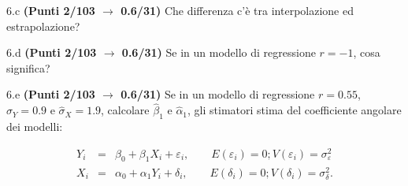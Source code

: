 \documentclass[
  11pt,
]{book}
\theoremstyle{mytheoremstyle}
\theoremstyle{mydefstyle}
\begin{document}
6.c \textbf{(Punti 2/103 \(\rightarrow\) 0.6/31)} Che differenza c'è tra interpolazione ed estrapolazione?

6.d \textbf{(Punti 2/103 \(\rightarrow\) 0.6/31)} Se in un modello di regressione \(r=-1\), cosa significa?

6.e \textbf{(Punti 2/103 \(\rightarrow\) 0.6/31)} Se in un modello di regressione \(r=0.55\), \(\hat\sigma_Y=0.9\) e \(\hat\sigma_X=1.9\), calcolare \(\hat\beta_1\) e
\(\hat\alpha_1\), gli stimatori stima del coefficiente angolare dei modelli:

\begin{eqnarray*}
Y_i &=& \beta_0+\beta_1 X_i + \varepsilon_i, \qquad E(\varepsilon_i)=0; V(\varepsilon_i)=\sigma_\varepsilon^2\\
X_i &=& \alpha_0+\alpha_1 Y_i + \delta_i, \qquad E(\delta_i)=0; V(\delta_i)=\sigma_\delta^2.
\end{eqnarray*}
\end{document}
